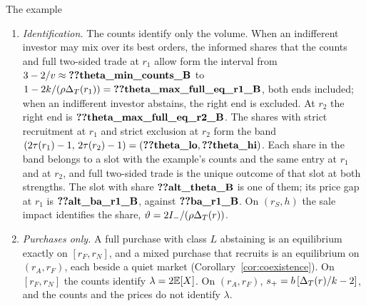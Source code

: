 \begin{named}{The example}
\begin{enumerate}[label=(\alph*),leftmargin=2em]
the price gap, both impacts, the price gap and the weighted impact difference rise strictly with \(r\). On
\((r_C,h)\), the entry component and the weighted impact difference are zero, and the class component, both impacts
and the price gap rise strictly. At \(r_1\) the class component is \(\reg{ba_class_r1_B}\) and the entry component
\(\reg{ba_entry_r1_B}\), so the price gap is \(\reg{ba_r1_B}\), of which the entry component is
\(\reg{ba_share_r1_B}\); the weighted impact difference \(\E[P(X)]-P(0)\) is \(\reg{wtest_r1_B}\). With a hidden price,
the price gap at \(r_1\) is the class component \(\reg{ba_class_r1_B}\). At \(r_C\) the price gap falls from
\(\reg{ba_rC_left_B}\) to \(\reg{ba_rC_right_B}\), by \(\reg{ba_jump_rC_B}\), and at \(r_2\) it is the class component
\(\reg{ba_r2_B}\). When an indifferent investor may mix over its best orders and an indifferent high-cost challenger
may prepare with any probability, entry after a purchase
at \(r_C\) can take any value in \([\rho,1]\), and the price gap at \(r_C\) any value from \(\reg{ba_rC_right_B}\)
to \(\reg{ba_rC_left_B}\).
\item \emph{Identification.} The counts identify only the volume. When an indifferent investor may mix over its best
orders, the informed shares that the counts and full two-sided trade at \(r_1\) allow form the interval from
\(3-2/v\approx\reg{theta_min_counts_B}\) to \(1-2k/(\rho\DT(r_1))=\reg{theta_max_full_eq_r1_B}\), both ends
included; when an indifferent investor abstains, the right end is excluded. At \(r_2\) the right end is
\(\reg{theta_max_full_eq_r2_B}\). The shares with strict recruitment at \(r_1\) and strict exclusion at \(r_2\) form
the band \((2\tau(r_1)-1,\,2\tau(r_2)-1)=(\reg{theta_lo},\reg{theta_hi})\). Each share in the band belongs to a slot
with the example's counts and the same entry at \(r_1\) and at \(r_2\), and full two-sided trade is the unique outcome
of that slot at both strengths. The slot with share \(\reg{alt_theta_B}\) is one of them; its price gap at \(r_1\)
is \(\reg{alt_ba_r1_B}\), against \(\reg{ba_r1_B}\). On \((r_S,h)\) the sale impact identifies the share,
\(\vartheta=2I_-/(\rho\Delta_T(r))\).
\item \emph{Purchases only.} A full purchase with class \(L\) abstaining is an equilibrium exactly on \([r_F,r_N]\),
and a mixed purchase that recruits is an equilibrium on \((r_A,r_F)\), each beside a quiet market
(Corollary~\ref{cor:coexistence}). On \([r_F,r_N]\) the counts identify \(\lambda=2\mathbb{E}[X]\). On \((r_A,r_F)\),
\(s_+=b\,[\Delta_T(r)/k-2]\), and the counts and the prices do not identify \(\lambda\).

\end{enumerate}
\end{named}
